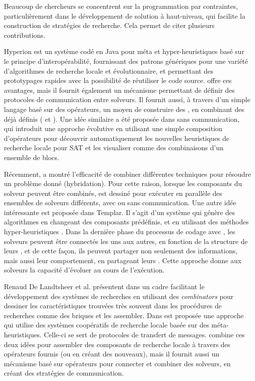 Beaucoup de chercheurs se concentrent sur la programmation par contraintes, particuli\`erement dans le d\'eveloppement de solution \`a haut-niveau, qui facilite la construction de strat\'egies de recherche. Cela permet de citer plusieurs contributions. 

{\sc Hyperion} \cite{Brownlee2014} est un syst\`eme cod\'e en Java pour m\'eta et hyper-heuristiques bas\'e sur le principe d'interop\'erabilit\'e, fournissant des patrons g\'en\'eriques pour une vari\'et\'e d'algorithmes de recherche locale et \'evolutionnaire, et permettant des prototypages rapides avec la possibilit\'e de r\'eutiliser le code source. \posl{} offre ces avantages, mais il fournit \'egalement un m\'ecanisme permettant de d\'efinir des protocoles de communication entre solveurs. Il fournit aussi, \`a travers d'un simple langage bas\'e sur des op\'erateurs, un moyen de construire des \ass, en combinant des \ms{} d\'ej\`a d\'efinis (\oms{} et \opchs). Une id\'ee similaire a \'et\'e propos\'ee dans \cite{Fukunaga2008} sans communication, qui introduit une approche \'evolutive en utilisant une simple composition d'op\'erateurs pour d\'ecouvrir automatiquement les nouvelles heuristiques de recherche locale pour SAT et les visualiser comme des combinaisons d'un ensemble de blocs.

R\'ecemment, \cite{El-Ghazali2013} a montr\'e l'efficacit\'e de combiner diff\'erentes techniques pour r\'esoudre un probl\`eme donn\'e (hybridation). Pour cette raison, lorsque les composants du solveur peuvent \^etre combin\'es, \posl{} est dessin\'e pour ex\'ecuter en parall\`ele des ensembles de solveurs diff\'erents, avec ou sans communication. Une autre id\'ee int\'eressante est propos\'ee dans {\sc Templar}. Il s'agit d'un syst\`eme qui g\'en\`ere des algorithmes en changeant des composants pr\'ed\'efinis, et en utilisant des m\'ethodes hyper-heuristiques \cite{Swan2015}. Dans la derni\`ere phase du processus de codage avec \posl{}, les solveurs peuvent \^etre connect\'es les uns aux autres, en fonction de la structure de leurs \opchs, et de cette fa\c{c}on, ils peuvent partager non seulement des informations, mais aussi leur comportement, en partageant leurs \oms. Cette approche donne aux solveurs la capacit\'e d'\'evoluer au cours de l'ex\'ecution.

Renaud De Landtsheer et al. pr\'esentent dans \cite{Landtsheer2015} un cadre facilitant le d\'eveloppement des syst\`emes de recherches en utilisant des \textit{combinators} pour dessiner les caract\'eristiques trouv\'ees tr\`es souvent dans les proc\'edures de recherches comme des briques et les assembler. Dans \cite{Martin2016} est propos\'ee une approche qui utilise des syst\`emes coop\'eratifs de recherche locale bas\'ee sur des m\'eta-heuristiques. Celle-ci se sert de protocoles de transfert de messages. \posl{} combine ces deux id\'ees pour assembler des composants de recherche locale \`a travers des op\'erateurs fournis (ou en cr\'eant des nouveaux), mais il fournit aussi un m\'ecanisme bas\'e sur op\'erateurs pour connecter et combiner des solveurs, en cr\'eant des strat\'egies de communication.

